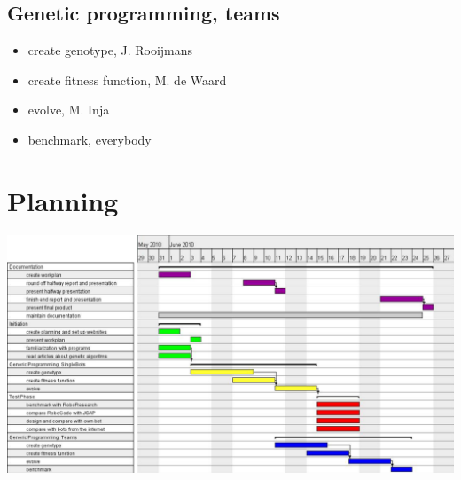 \documentclass[a4paper,10pt]{article}
\begin{document}
\subsection{Genetic programming, teams}
\begin{itemize}
\item create genotype, J. Rooijmans
\item create fitness function, M. de Waard
\item evolve, M. Inja
\item benchmark, everybody
\end{itemize}
\newpage


\newpage
\appendix
\section{Planning}
\label{planning}
\includegraphics[height=0.75\textwidth, angle=-90]{planning.png}
\end{document}
